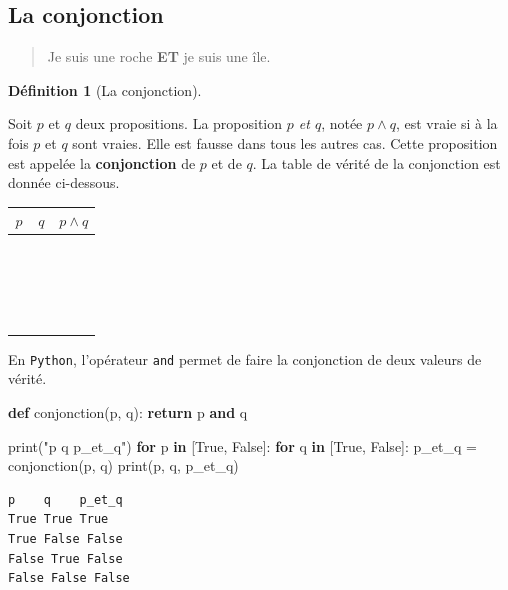 \documentclass[
  letterpaper,
]{scrbook}
\newenvironment{Shaded}{\begin{snugshade}}{\end{snugshade}}
\newcommand{\BuiltInTok}[1]{\textcolor[rgb]{0.00,0.50,0.00}{#1}}
\newcommand{\ControlFlowTok}[1]{\textcolor[rgb]{0.00,0.44,0.13}{\textbf{#1}}}
\newcommand{\KeywordTok}[1]{\textcolor[rgb]{0.00,0.44,0.13}{\textbf{#1}}}
\newcommand{\NormalTok}[1]{\textcolor[rgb]{0.00,0.44,0.13}{#1}}
\newcommand{\OperatorTok}[1]{\textcolor[rgb]{0.40,0.40,0.40}{#1}}
\newcommand{\StringTok}[1]{\textcolor[rgb]{0.25,0.44,0.63}{#1}}
\newcommand{\VariableTok}[1]{\textcolor[rgb]{0.10,0.09,0.49}{#1}}
\theoremstyle{plain}
\theoremstyle{definition}
\newtheorem{definition}{Définition}[chapter]
\theoremstyle{definition}
\theoremstyle{remark}
\begin{document}
\hypertarget{la-conjonction}{%
\subsection{La conjonction}\label{la-conjonction}}

\begin{quote}
Je suis une roche \textbf{ET} je suis une île.
\end{quote}

\begin{definition}[La
conjonction]\protect\hypertarget{def-conjonction}{}\label{def-conjonction}

Soit \(p\) et \(q\) deux propositions. La proposition \emph{\(p\) et
\(q\)}, notée \(p\wedge q\), est vraie si à la fois \(p\) et \(q\) sont
vraies. Elle est fausse dans tous les autres cas. Cette proposition est
appelée la \textbf{conjonction} de \(p\) et de \(q\). La table de vérité
de la conjonction est donnée ci-dessous.

\begin{longtable}[]{@{}ccc@{}}
\toprule\noalign{}
\(p\) & \(q\) & \(p \wedge q\) \\
\midrule\noalign{}
\endhead
\bottomrule\noalign{}
\endlastfoot
\(\phantom{V}\) & \(\phantom{V}\) & \(\phantom{V}\) \\
\(\phantom{V}\) & \(\phantom{V}\) & \(\phantom{V}\) \\
\(\phantom{V}\) & \(\phantom{V}\) & \(\phantom{V}\) \\
\(\phantom{V}\) & \(\phantom{V}\) & \(\phantom{V}\) \\
\end{longtable}

En \texttt{Python}, l'opérateur \texttt{and} permet de faire la
conjonction de deux valeurs de vérité.

\hypertarget{conjonction-python}{}
\begin{Shaded}
\begin{Highlighting}[]
\KeywordTok{def}\NormalTok{ conjonction(p, q):}
    \ControlFlowTok{return}\NormalTok{ p }\KeywordTok{and}\NormalTok{ q}

\BuiltInTok{print}\NormalTok{(}\StringTok{"p    q    p\_et\_q"}\NormalTok{)}
\ControlFlowTok{for}\NormalTok{ p }\KeywordTok{in}\NormalTok{ [}\VariableTok{True}\NormalTok{, }\VariableTok{False}\NormalTok{]:}
    \ControlFlowTok{for}\NormalTok{ q }\KeywordTok{in}\NormalTok{ [}\VariableTok{True}\NormalTok{, }\VariableTok{False}\NormalTok{]:}
\NormalTok{        p\_et\_q }\OperatorTok{=}\NormalTok{ conjonction(p, q)}
        \BuiltInTok{print}\NormalTok{(p, q, p\_et\_q)}
\end{Highlighting}
\end{Shaded}

\begin{verbatim}
p    q    p_et_q
True True True
True False False
False True False
False False False
\end{verbatim}

\end{definition}
\end{document}
